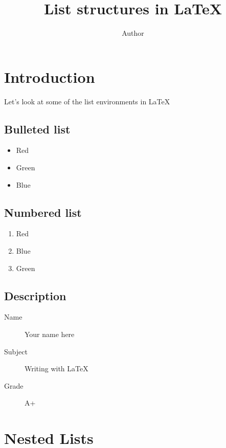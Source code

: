 \documentclass{article}
\title{List structures in \LaTeX}
\author{Author}
\date{}
\begin{document}
    \maketitle

    \section{Introduction}

    Let's look at some of the list environments in \LaTeX

    \subsection{Bulleted list}
    
    \begin{itemize}
    \item Red
    \item Green
    \item Blue
    \end{itemize}
    
    \subsection{Numbered list}

    \begin{enumerate}
        \item Red
        \item Blue
        \item Green
    \end{enumerate}

    \subsection{Description}

    \begin{description}
        \item[Name] Your name here
        \item[Subject] Writing with \LaTeX
        \item[Grade] A+
    \end{description}

    \section{Nested Lists}
\end{document}

